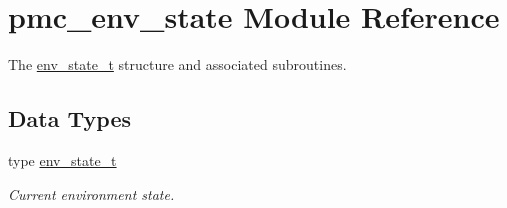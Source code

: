 \hypertarget{namespacepmc__env__state}{}\section{pmc\+\_\+env\+\_\+state Module Reference}
\label{namespacepmc__env__state}


The \mbox{\hyperlink{structpmc__env__state_1_1env__state__t}{env\+\_\+state\+\_\+t}} structure and associated subroutines.  


\subsection*{Data Types}
\begin{DoxyCompactItemize}
\item 
type \mbox{\hyperlink{structpmc__env__state_1_1env__state__t}{env\+\_\+state\+\_\+t}}
\begin{DoxyCompactList}\small\item\em Current environment state. \end{DoxyCompactList}\end{DoxyCompactItemize}
